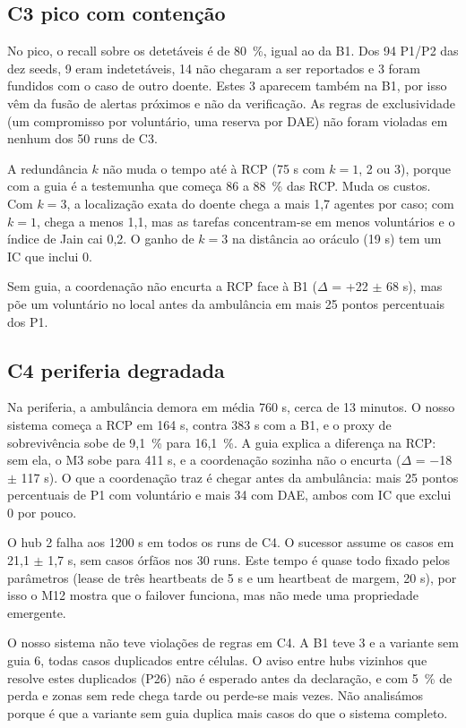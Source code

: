 \documentclass[11pt,a4paper]{article}
\begin{document}
\subsection{C3 pico com contenção}

No pico, o recall sobre os detetáveis é de 80~\%, igual ao da B1. Dos 94 P1/P2 das dez seeds, 9 eram indetetáveis, 14 não chegaram a ser reportados e 3 foram fundidos com o caso de outro doente. Estes 3 aparecem também na B1, por isso vêm da fusão de alertas próximos e não da verificação. As regras de exclusividade (um compromisso por voluntário, uma reserva por DAE) não foram violadas em nenhum dos 50 runs de C3.

A redundância $k$ não muda o tempo até à RCP (75 s com $k = 1$, 2 ou 3), porque com a guia é a testemunha que começa 86 a 88~\% das RCP. Muda os custos. Com $k = 3$, a localização exata do doente chega a mais 1,7 agentes por caso; com $k = 1$, chega a menos 1,1, mas as tarefas concentram-se em menos voluntários e o índice de Jain cai 0,2. O ganho de $k = 3$ na distância ao oráculo (19 s) tem um IC que inclui 0.

Sem guia, a coordenação não encurta a RCP face à B1 ($\Delta$ = +22 $\pm$ 68 s), mas põe um voluntário no local antes da ambulância em mais 25 pontos percentuais dos P1.

\subsection{C4 periferia degradada}

Na periferia, a ambulância demora em média 760 s, cerca de 13 minutos. O nosso sistema começa a RCP em 164 s, contra 383 s com a B1, e o proxy de sobrevivência sobe de 9,1~\% para 16,1~\%. A guia explica a diferença na RCP: sem ela, o M3 sobe para 411 s, e a coordenação sozinha não o encurta ($\Delta$ = $-$18 $\pm$ 117 s). O que a coordenação traz é chegar antes da ambulância: mais 25 pontos percentuais de P1 com voluntário e mais 34 com DAE, ambos com IC que exclui 0 por pouco.

O hub 2 falha aos 1200 s em todos os runs de C4. O sucessor assume os casos em 21,1 $\pm$ 1,7 s, sem casos órfãos nos 30 runs. Este tempo é quase todo fixado pelos parâmetros (lease de três heartbeats de 5 s e um heartbeat de margem, 20 s), por isso o M12 mostra que o failover funciona, mas não mede uma propriedade emergente.

O nosso sistema não teve violações de regras em C4. A B1 teve 3 e a variante sem guia 6, todas casos duplicados entre células. O aviso entre hubs vizinhos que resolve estes duplicados (P26) não é esperado antes da declaração, e com 5~\% de perda e zonas sem rede chega tarde ou perde-se mais vezes. Não analisámos porque é que a variante sem guia duplica mais casos do que o sistema completo.
\end{document}
